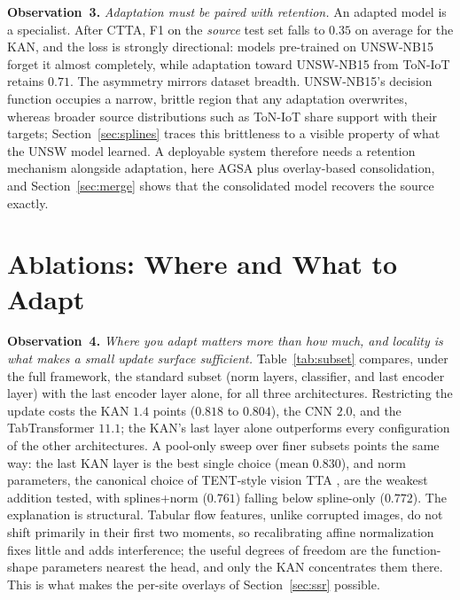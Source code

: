 \documentclass[10pt, conference, letterpaper]{IEEEtran}
\newcommand{\obs}[1]{\vspace{2pt}\noindent\textbf{Observation~#1.}}
\begin{document}
\obs{3} \emph{Adaptation must be paired with retention.} An adapted
model is a specialist. After CTTA, F1 on the \emph{source} test set
falls to $0.35$ on average for the KAN, and the loss is strongly
directional: models pre-trained on UNSW-NB15 forget it almost
completely, while adaptation toward UNSW-NB15 from ToN-IoT retains
$0.71$. The asymmetry mirrors dataset breadth. UNSW-NB15's decision
function occupies a narrow, brittle region that any adaptation
overwrites, whereas broader source distributions such as ToN-IoT share
support with their targets; Section~\ref{sec:splines} traces this
brittleness to a visible property of what the UNSW model learned. A
deployable system therefore needs a retention mechanism alongside
adaptation, here AGSA plus overlay-based consolidation, and
Section~\ref{sec:merge} shows that the consolidated model recovers the
source exactly.

\section{Ablations: Where and What to Adapt}\label{sec:ablate}





\obs{4} \emph{Where you adapt matters more than how much, and locality
is what makes a small update surface sufficient.}
Table~\ref{tab:subset} compares, under the full framework, the
standard subset (norm layers, classifier, and last encoder layer) with
the last encoder layer alone, for all three architectures. Restricting
the update costs the KAN $1.4$ points ($0.818$ to $0.804$), the CNN
$2.0$, and the TabTransformer $11.1$; the KAN's last layer alone
outperforms every configuration of the other architectures. A
pool-only sweep over finer subsets points the same way: the last KAN
layer is the best single choice (mean $0.830$), and norm parameters,
the canonical choice of TENT-style vision TTA
\cite{wang2021tent,schneider2020bn}, are the weakest addition tested,
with splines+norm ($0.761$) falling below spline-only ($0.772$). The
explanation is structural. Tabular flow features, unlike corrupted
images, do not shift primarily in their first two moments, so
recalibrating affine normalization fixes little and adds interference;
the useful degrees of freedom are the function-shape parameters
nearest the head, and only the KAN concentrates them there. This is
what makes the per-site overlays of Section~\ref{sec:ssr} possible.
\end{document}
